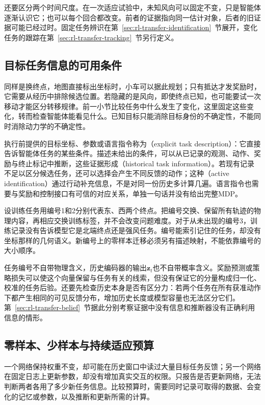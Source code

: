 还要区分两个时间尺度。在一次适应试验中，未知风向可以固定不变，只是智能体逐渐认识它；也可以每个回合都改变。前者的证据指向同一估计对象，后者的旧证据可能已经过时。固定任务辨识在第~\ref{sec:rl-transfer-identification}~节展开，变化任务的跟踪在第~\ref{sec:rl-transfer-tracking}~节另行定义。

\subsection{目标任务信息的可用条件}
\label{sec:rl-transfer-information}

同样是换终点，地图直接标出坐标时，小车可以据此规划；只有抵达才发奖励时，它需要从经历中排除候选位置。若隐藏的是风向，即使终点已知，也可能要试一次移动才能区分转移规律。前一小节比较任务中什么发生了变化，这里固定这些变化，转而检查智能体能看见什么。已知目标只能消除目标身份的不确定性，不能同时消除动力学的不确定性。

执行前提供的目标坐标、参数或语言指令称为（explicit task description）：它直接告诉智能体任务的某些条件。描述未给出的条件，可以从已记录的观测、动作、奖励与终止标记中推断，这些证据形成（historical task information）。若现有记录不足以区分候选任务，还可以选择会产生不同反馈的动作；这种（active identification）通过行动补充信息，不是对同一份历史多计算几遍。语言指令也需要与奖励和控制接口有可信的对应关系，单独一句话并没有给出完整MDP。

设训练任务用编号1和2分别代表东、西两个终点。把编号交换、保留所有轨迹的物理内容，再相应交换训练标签，并不会改变问题难度。对于从未出现的编号3，训练记录没有告诉模型它是北端终点还是强风任务。编号能索引记住的任务，却没有坐标那样的几何语义。新编号上的零样本迁移必须另有描述映射，不能依靠编号的大小顺序。

任务编号不自带物理含义，历史编码器的输出$\bm z_t$也不自带概率含义。奖励预测或策略损失可以使这个向量保留与任务有关的线索，但没有保证它的分量构成归一化、校准的任务后验。还要先检查历史本身是否有区分力：若两个任务在所有获准动作下都产生相同的可见反馈分布，增加历史长度或模型容量也无法区分它们。第~\ref{sec:rl-transfer-belief}~节据此分别考察证据中没有信息和推断器没有正确利用信息的情形。

\subsection{零样本、少样本与持续适应预算}
\label{sec:rl-transfer-budget}

一个网络保持权重不变，却可能在历史窗口中读过大量目标任务反馈；另一个网络在固定日志上更新参数，却没有增加真实交互的权限。只报告是否更新网络，无法判断两者各用了多少新任务信息。比较预算时，需要同时记录可取得的数据、会变化的记忆或参数，以及推断和更新所需的计算。

